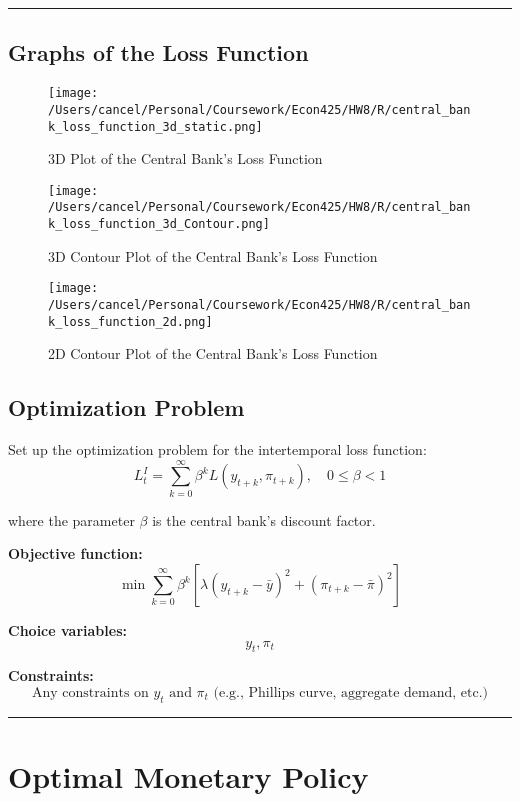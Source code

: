 \documentclass{article}
\begin{document}
\noindent\rule{\linewidth}{0.5pt}
\newpage
\subsection{Graphs of the Loss Function}

\begin{figure}[ht!]
    \centering
    \texttt{[image: /Users/cancel/Personal/Coursework/Econ425/HW8/R/central\_bank\_loss\_function\_3d\_static.png]}
    \caption{3D Plot of the Central Bank's Loss Function}
\label{fig:loss_function_3d}
\end{figure}

\begin{figure}[ht!]
    \centering
    \texttt{[image: /Users/cancel/Personal/Coursework/Econ425/HW8/R/central\_bank\_loss\_function\_3d\_Contour.png]}
    \caption{3D Contour Plot of the Central Bank's Loss Function}
\label{fig:loss_function_3d_contour}
\end{figure}

\begin{figure}[ht!]
    \centering
    \texttt{[image: /Users/cancel/Personal/Coursework/Econ425/HW8/R/central\_bank\_loss\_function\_2d.png]}
    \caption{2D Contour Plot of the Central Bank's Loss Function}
\label{fig:loss_function_2d}
\end{figure}

\FloatBarrier

\subsection{Optimization Problem}

Set up the optimization problem for the intertemporal loss function:
\[
L^I_t = \sum_{k=0}^{\infty} \beta^k L (y_{t+k}, \pi_{t+k}), \quad 0 \leq \beta < 1 
\]

where the parameter \(\beta\) is the central bank's discount factor.

\textbf{Objective function:}
\[
\min \sum_{k=0}^{\infty} \beta^k \left[ \lambda (y_{t+k} - \bar{y})^2 + (\pi_{t+k} - \bar{\pi})^2 \right]
\]

\textbf{Choice variables:}
\[ y_t, \pi_t \]

\textbf{Constraints:}
\[ \text{Any constraints on } y_t \text{ and } \pi_t \text{ (e.g., Phillips curve, aggregate demand, etc.)} \]

\noindent\rule{\linewidth}{0.5pt}

\section{Optimal Monetary Policy}
\end{document}

